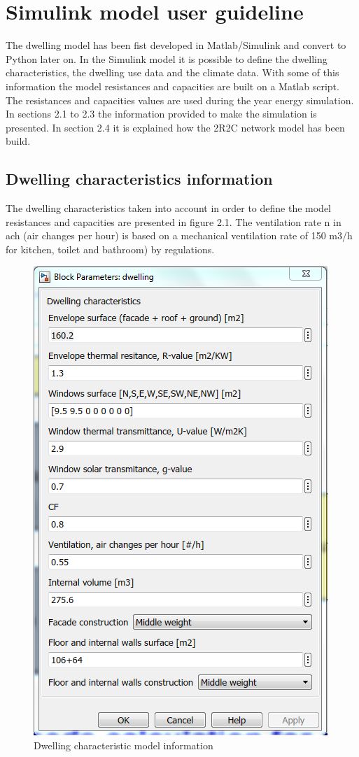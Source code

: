 \section{Simulink model user guideline}

The dwelling model has been fist developed in Matlab/Simulink and convert to Python later on. In the Simulink model it is possible to define the dwelling characteristics, the dwelling use data and the climate data. With some of this information the model resistances and capacities are built on a Matlab script. The resistances and capacities values are used during the year energy simulation. 
In sections 2.1 to 2.3 the information provided to make the simulation is presented. In section 2.4 it is explained how the 2R2C network model has been build.

\subsection{Dwelling characteristics information}
	
The dwelling characteristics taken into account in order to define the model resistances and capacities are presented in figure 2.1. The ventilation rate n in ach (air changes per hour) is based on a mechanical ventilation rate of 150 m3/h for kitchen, toilet and bathroom) by regulations.

\begin{figure}[H]
	\centering
	\includegraphics[width=0.8\columnwidth]{Pictures/dwelling characteristic model information.png}
	\caption[Short title]{Dwelling characteristic model information}
	\label{figure: Dwelling characteristic}
\end{figure}
\newpage
